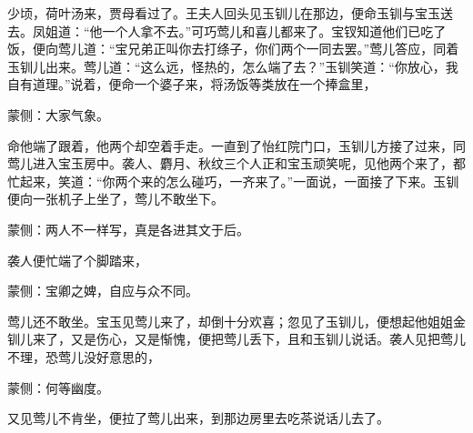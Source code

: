 \begin{parag}
    少顷，荷叶汤来，贾母看过了。王夫人回头见玉钏儿在那边，便命玉钏与宝玉送去。凤姐道：“他一个人拿不去。”可巧莺儿和喜儿都来了。宝钗知道他们已吃了饭，便向莺儿道：“宝兄弟正叫你去打绦子，你们两个一同去罢。”莺儿答应，同着玉钏儿出来。莺儿道：“这么远，怪热的，怎么端了去？”玉钏笑道：“你放心，我自有道理。”说着，便命一个婆子来，将汤饭等类放在一个捧盒里，\begin{note}蒙侧：大家气象。\end{note}命他端了跟着，他两个却空着手走。一直到了怡红院门口，玉钏儿方接了过来，同莺儿进入宝玉房中。袭人、麝月、秋纹三个人正和宝玉顽笑呢，见他两个来了，都忙起来，笑道：“你两个来的怎么碰巧，一齐来了。”一面说，一面接了下来。玉钏便向一张机子上坐了，莺儿不敢坐下。\begin{note}蒙侧：两人不一样写，真是各进其文于后。\end{note}袭人便忙端了个脚踏来，\begin{note}蒙侧：宝卿之婢，自应与众不同。\end{note}莺儿还不敢坐。宝玉见莺儿来了，却倒十分欢喜；忽见了玉钏儿，便想起他姐姐金钏儿来了，又是伤心，又是惭愧，便把莺儿丢下，且和玉钏儿说话。袭人见把莺儿不理，恐莺儿没好意思的，\begin{note}蒙侧：何等幽度。\end{note}又见莺儿不肯坐，便拉了莺儿出来，到那边房里去吃茶说话儿去了。
\end{parag}


